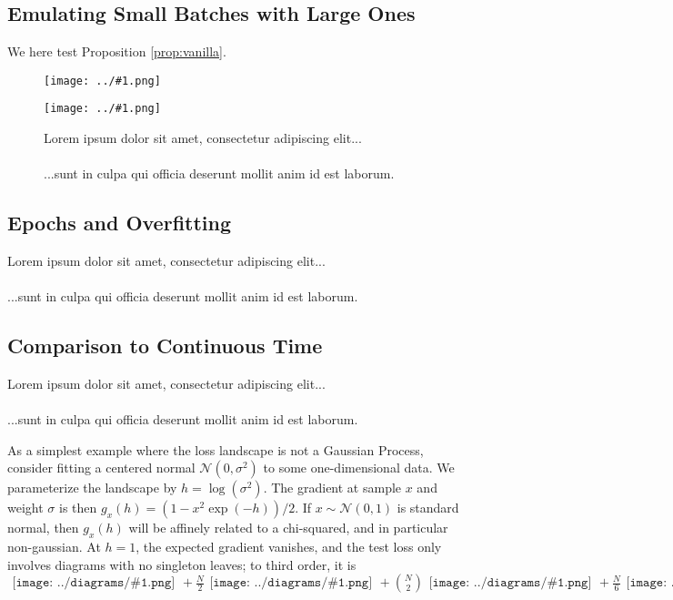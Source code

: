 \documentclass{article}
\newcommand{\Nn}{\mathcal{N}}
\newcommand{\plotmoo}[3]{
    \texttt{[image: ../\#1.png]}
}
\newcommand{\sdia}[1]{\begin{gathered}\texttt{[image: ../diagrams/\#1.png]}\end{gathered}}
\newcommand{\lorem}[1]{
    Lorem ipsum dolor sit amet, consectetur adipiscing elit...\\
    \nopagebreak\vspace{#1cm} \ \\
    ...sunt in culpa qui officia deserunt mollit anim id est laborum.
}
\begin{document}
    \subsection{Emulating Small Batches with Large Ones}
        We here test Proposition \ref{prop:vanilla}. 
        \begin{figure}[h!]
            \centering
            \plotmoo{plots/big-bm}{0.48\columnwidth}{4.0cm}
            \plotmoo{plots/multi-fashion-logistic-0}{0.48\columnwidth}{4.0cm}
            \caption{\lorem{2}}
        \end{figure}
    

    \subsection{Epochs and Overfitting}
        \lorem{3}
    

    \subsection{Comparison to Continuous Time}
        \lorem{3}
        As a simplest example where the loss landscape is not a Gaussian
        Process, consider fitting a centered normal $\Nn(0, \sigma^2)$ to some
        one-dimensional data.  We parameterize the landscape by
        $h=\log(\sigma^2)$.  The gradient at sample $x$ and weight $\sigma$ is
        then $g_x(h) = (1-x^2\exp(-h))/2$.  If $x\sim \Nn(0, 1)$ is standard
        normal, then $g_x(h)$ will be affinely related to a chi-squared, and in
        particular non-gaussian.  At $h=1$, the expected gradient vanishes, and
        the test loss only involves diagrams with no singleton leaves; to third
        order, it is
        $
            \sdia{(0)()}
            +\frac{N}{2} \sdia{c(01-2)(02-12)}
            +{N\choose 2} \sdia{c(03-1-2)(01-12-23)}
            +\frac{N}{6} \sdia{c(012-3)(03-13-23)}
        $

\end{document}
